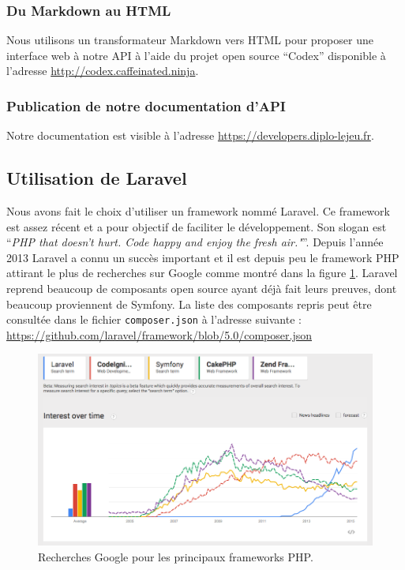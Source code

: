 		\subsubsection{Du Markdown au HTML}
			Nous utilisons un transformateur Markdown vers HTML pour proposer une interface web à notre API à l'aide du projet open source \enquote{Codex} disponible à l'adresse \url{http://codex.caffeinated.ninja}.\\

		\subsubsection{Publication de notre documentation d'API}
			Notre documentation est visible à l'adresse \url{https://developers.diplo-lejeu.fr}.

	\subsection{Utilisation de Laravel}
		Nous avons fait le choix d'utiliser un framework nommé Laravel. Ce framework est assez récent et a pour objectif de faciliter le développement. Son slogan est \enquote{\textit{PHP that doesn't hurt. Code happy and enjoy the fresh air."}}. Depuis l'année 2013 Laravel a connu un succès important et il est depuis peu le framework PHP attirant le plus de recherches sur Google comme montré dans la figure \ref{fig:trends-php-frameworks}. Laravel reprend beaucoup de composants open source ayant déjà fait leurs preuves, dont beaucoup proviennent de Symfony. La liste des composants repris peut être consultée dans le fichier \texttt{composer.json} à l'adresse suivante : \url{https://github.com/laravel/framework/blob/5.0/composer.json}

		\begin{figure}[H]
			\centering
			\includegraphics[width=1\textwidth]{images/trends-php-frameworks.png}
			\caption{Recherches Google pour les principaux frameworks PHP.}
			\label{fig:trends-php-frameworks}
		\end{figure}


